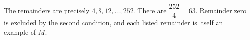 The remainders are precisely $4,8,12,\ldots,252$. There are $\dfrac{252}{4}=\boxed{63}$. Remainder zero is excluded by the second condition, and each listed remainder is itself an example of $M$.
